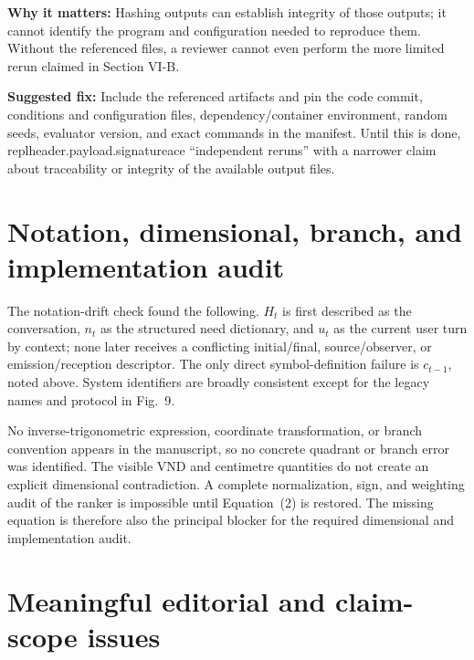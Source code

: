 \documentclass[11pt]{article}
\begin{document}
\textbf{Why it matters:} Hashing outputs can establish integrity of those outputs; it cannot identify the program and configuration needed to reproduce them.  Without the referenced files, a reviewer cannot even perform the more limited rerun claimed in Section VI-B.

\textbf{Suggested fix:} Include the referenced artifacts and pin the code commit, conditions and configuration files, dependency/container environment, random seeds, evaluator version, and exact commands in the manifest.  Until this is done, replheader.payload.signatureace ``independent reruns'' with a narrower claim about traceability or integrity of the available output files.

\section*{Notation, dimensional, branch, and implementation audit}

The notation-drift check found the following.  $H_t$ is first described as the conversation, $n_t$ as the structured need dictionary, and $u_t$ as the current user turn by context; none later receives a conflicting initial/final, source/observer, or emission/reception descriptor.  The only direct symbol-definition failure is $c_{t-1}$, noted above.  System identifiers are broadly consistent except for the legacy names and protocol in Fig.~9.

No inverse-trigonometric expression, coordinate transformation, or branch convention appears in the manuscript, so no concrete quadrant or branch error was identified.  The visible VND and centimetre quantities do not create an explicit dimensional contradiction.  A complete normalization, sign, and weighting audit of the ranker is impossible until Equation~(2) is restored.  The missing equation is therefore also the principal blocker for the required dimensional and implementation audit.

\section*{Meaningful editorial and claim-scope issues}
\end{document}
